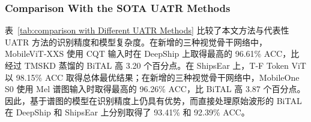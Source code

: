 \documentclass[a4paper, 12pt]{article}
\begin{document}





\subsubsection{Comparison With the SOTA UATR Methods}
表~\ref{tab:comparison with Different UATR Methods} 比较了本文方法与代表性 UATR 方法的识别精度和模型复杂度。在新增的三种视觉骨干网络中，MobileViT-XXS 使用 CQT 输入时在 DeepShip 上取得最高的 96.61\% ACC，比经过 TMSKD 蒸馏的 BiTAL 高 3.20 个百分点。在 ShipsEar 上，T-F Token ViT 以 98.15\% ACC 取得总体最优结果；在新增的三种视觉骨干网络中，MobileOne S0 使用 Mel 谱图输入时取得最高的 96.26\% ACC，比 BiTAL 高 3.87 个百分点。因此，基于谱图的模型在识别精度上仍具有优势，而直接处理原始波形的 BiTAL 在 DeepShip 和 ShipsEar 上分别取得了 93.41\% 和 92.39\% ACC。
\end{document}
